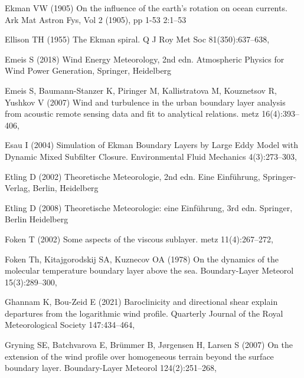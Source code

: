 \documentclass[smallcondensed,final]{svjour3}
\begin{document}
\begin{thebibliography}{57}
Ekman VW (1905) On the influence of the earth's rotation on ocean currents. Ark
  Mat Astron Fys, Vol 2 (1905), pp 1-53 2:1--53

Ellison TH (1955) The {{Ekman}} spiral. Q J Roy Met Soc 81(350):637--638,

Emeis S (2018) Wind {{Energy Meteorology}}, 2nd edn. Atmospheric {{Physics}}
  for {{Wind Power Generation}}, Springer, Heidelberg

Emeis S, {Baumann-Stanzer} K, Piringer M, Kallistratova M, Kouznetsov R,
  Yushkov V (2007) Wind and turbulence in the urban boundary layer analysis
  from acoustic remote sensing data and fit to analytical relations. metz
  16(4):393--406, 

Esau I (2004) Simulation of {{Ekman Boundary Layers}} by {{Large Eddy Model}}
  with {{Dynamic Mixed Subfilter Closure}}. Environmental Fluid Mechanics
  4(3):273--303, 

Etling D (2002) Theoretische {{Meteorologie}}, 2nd edn. Eine
  {{Einf{\"u}hrung}}, Springer-Verlag, Berlin, Heidelberg

Etling D (2008) {Theoretische Meteorologie: eine Einf{\"u}hrung}, 3rd edn.
  Springer, Berlin Heidelberg

Foken T (2002) Some aspects of the viscous sublayer. metz 11(4):267--272,

Foken {\relax Th}, Kitajgorodskij SA, Kuznecov OA (1978) On the dynamics of the
  molecular temperature boundary layer above the sea. Boundary-Layer Meteorol
  15(3):289--300, 

Ghannam K, {Bou-Zeid} E (2021) Baroclinicity and directional shear explain
  departures from the logarithmic wind profile. Quarterly Journal of the Royal
  Meteorological Society 147:434--464, 

Gryning SE, Batchvarova E, Br{\"u}mmer B, J{\o}rgensen H, Larsen S (2007) On
  the extension of the wind profile over homogeneous terrain beyond the surface
  boundary layer. Boundary-Layer Meteorol 124(2):251--268,


\end{thebibliography}
\end{document}
